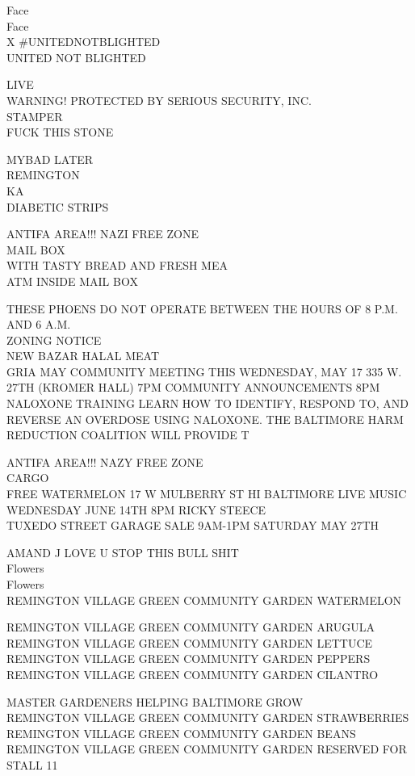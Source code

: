 \documentclass[10pt,letterpaper]{article}
\begin{document}
Face\\
Face\\
X \#UNITEDNOTBLIGHTED\\
UNITED NOT BLIGHTED

LIVE\\
WARNING!  PROTECTED BY SERIOUS SECURITY, INC.\\
STAMPER\\
FUCK THIS STONE

MYBAD LATER\\
REMINGTON\\
KA\\
DIABETIC STRIPS

ANTIFA AREA!!! NAZI FREE ZONE\\
MAIL BOX\\
WITH TASTY BREAD AND FRESH MEA\\
ATM INSIDE MAIL BOX

THESE PHOENS DO NOT OPERATE BETWEEN THE HOURS OF 8 P.M. AND 6 A.M.\\
ZONING NOTICE\\
NEW BAZAR HALAL MEAT\\
GRIA MAY COMMUNITY MEETING THIS WEDNESDAY, MAY 17 335 W. 27TH (KROMER HALL) 7PM COMMUNITY ANNOUNCEMENTS 8PM NALOXONE TRAINING LEARN HOW TO IDENTIFY, RESPOND TO, AND REVERSE AN OVERDOSE USING NALOXONE.  THE BALTIMORE HARM REDUCTION COALITION WILL PROVIDE T

ANTIFA AREA!!! NAZY FREE ZONE\\
CARGO\\
FREE WATERMELON 17 W MULBERRY ST HI BALTIMORE LIVE MUSIC WEDNESDAY JUNE 14TH 8PM RICKY STEECE\\
TUXEDO STREET GARAGE SALE 9AM{-}1PM SATURDAY MAY 27TH

AMAND J LOVE U STOP THIS BULL SHIT\\
Flowers\\
Flowers\\
REMINGTON VILLAGE GREEN COMMUNITY GARDEN WATERMELON

REMINGTON VILLAGE GREEN COMMUNITY GARDEN ARUGULA\\
REMINGTON VILLAGE GREEN COMMUNITY GARDEN LETTUCE\\
REMINGTON VILLAGE GREEN COMMUNITY GARDEN PEPPERS\\
REMINGTON VILLAGE GREEN COMMUNITY GARDEN CILANTRO

MASTER GARDENERS HELPING BALTIMORE GROW\\
REMINGTON VILLAGE GREEN COMMUNITY GARDEN STRAWBERRIES\\
REMINGTON VILLAGE GREEN COMMUNITY GARDEN BEANS\\
REMINGTON VILLAGE GREEN COMMUNITY GARDEN RESERVED FOR STALL 11
\end{document}
